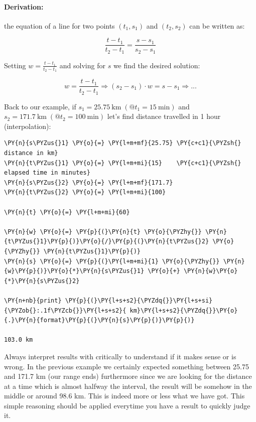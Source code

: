 \begin{tcolorbox}[breakable, size=fbox, boxrule=1pt, pad at break*=1mm,colback=cellbackground, colframe=cellborder]
\paragraph{Derivation:} the equation of a line for two points
\((t_1, s_1)\) and \((t_2, s_2)\) can be written as:

\[\frac{t - t_1}{t_2 - t_1} = \frac{s - s_1}{s_2 - s_1}\]

Setting \(w = \frac{t - t_1}{t_2 - t_1}\) and solving for \(s\) we find the desired solution:

\[w = \frac{t - t_1}{t_2 - t_1} \Rightarrow (s_2 - s_1)\cdot w = s - s_1 \Rightarrow ...\]
 \end{tcolorbox}
 
Back to our example, if
\(s_1 = 25.75~\mathrm{km}\;(@t_1 = 15~\mathrm{min})\) and
\(s_2 = 171.7~\mathrm{km}\;(@t_2 = 100~\mathrm{min})\) let's find distance travelled in 1 hour (interpolation):

\begin{tcolorbox}[breakable, size=fbox, boxrule=1pt, pad at break*=1mm,colback=cellbackground, colframe=cellborder]
\begin{Verbatim}[commandchars=\\\{\}]
\PY{n}{s\PYZus{}1} \PY{o}{=} \PY{l+m+mf}{25.75} \PY{c+c1}{\PYZsh{} distance in km}
\PY{n}{t\PYZus{}1} \PY{o}{=} \PY{l+m+mi}{15}    \PY{c+c1}{\PYZsh{} elapsed time in minutes}
\PY{n}{s\PYZus{}2} \PY{o}{=} \PY{l+m+mf}{171.7}
\PY{n}{t\PYZus{}2} \PY{o}{=} \PY{l+m+mi}{100}

\PY{n}{t} \PY{o}{=} \PY{l+m+mi}{60}

\PY{n}{w} \PY{o}{=} \PY{p}{(}\PY{n}{t} \PY{o}{\PYZhy{}} \PY{n}{t\PYZus{}1}\PY{p}{)}\PY{o}{/}\PY{p}{(}\PY{n}{t\PYZus{}2} \PY{o}{\PYZhy{}} \PY{n}{t\PYZus{}1}\PY{p}{)}
\PY{n}{s} \PY{o}{=} \PY{p}{(}\PY{l+m+mi}{1} \PY{o}{\PYZhy{}} \PY{n}{w}\PY{p}{)}\PY{o}{*}\PY{n}{s\PYZus{}1} \PY{o}{+} \PY{n}{w}\PY{o}{*}\PY{n}{s\PYZus{}2}

\PY{n+nb}{print} \PY{p}{(}\PY{l+s+s2}{\PYZdq{}}\PY{l+s+si}{\PYZob{}:.1f\PYZcb{}}\PY{l+s+s2}{ km}\PY{l+s+s2}{\PYZdq{}}\PY{o}{.}\PY{n}{format}\PY{p}{(}\PY{n}{s}\PY{p}{)}\PY{p}{)}

103.0 km
\end{Verbatim}
\end{tcolorbox}

Always interpret results with critically to understand if it makes sense or is wrong. In the previous example we certainly expected something between 25.75 and 171.7 km (our range ends) furthermore since we are looking for the distance at a time which is almost halfway the interval, the result will be somehow in the middle or around 98.6 km. This is indeed more or less what we have got.
This simple reasoning should be applied everytime you have a result to quickly judge it.

